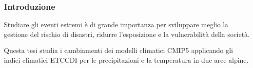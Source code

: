 \documentclass[14pt,usenames,dvipsnames]{beamer}
\begin{document}
\begin{frame}
\frametitle{Introduzione}
Studiare gli eventi estremi è di grande importanza per sviluppare meglio la gestione del rischio di disastri, ridurre l'esposizione e la vulnerabilità della società. 

\vspace{10pt}
Questa tesi studia i cambiamenti dei modelli climatici CMIP5 applicando gli indici climatici ETCCDI per le precipitazioni e la temperatura in due aree alpine.
\end{frame}



%



\end{document}
